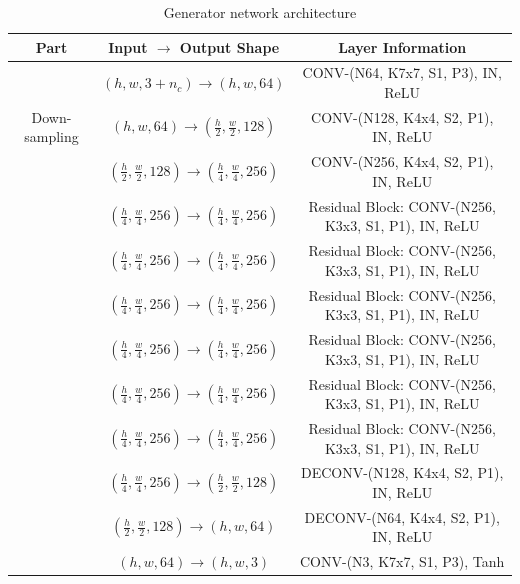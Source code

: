 \documentclass[10pt,twocolumn,letterpaper]{article}
\begin{document}
\medskip



\begin{table}[h]
\setlength{\tabcolsep}{13pt}
\renewcommand{\arraystretch}{1.7}
\begin{center}
\begin{tabular}{c  c  c}
Part & Input $\rightarrow$ Output Shape & Layer Information \\
\hline \hline
\multirow{3}{*}{Down-sampling} & $(h, w, 3+{n}_{c}) \rightarrow (h, w, 64)$ & CONV-(N64, K7x7, S1, P3), IN, ReLU \\
& $(h, w, 64) \rightarrow (\frac{h}{2}, \frac{w}{2}, 128)$ & CONV-(N128, K4x4, S2, P1), IN, ReLU \\
& $(\frac{h}{2}, \frac{w}{2}, 128) \rightarrow (\frac{h}{4}, \frac{w}{4},256)$ & CONV-(N256, K4x4, S2, P1), IN, ReLU \\
\Xhline{1.0pt}
\multirow{6}{*}{Bottleneck} & $(\frac{h}{4}, \frac{w}{4}, 256) \rightarrow (\frac{h}{4}, \frac{w}{4}, 256)$ & Residual Block: CONV-(N256, K3x3, S1, P1), IN, ReLU\\
 & $(\frac{h}{4}, \frac{w}{4}, 256) \rightarrow (\frac{h}{4}, \frac{w}{4}, 256)$ &  Residual Block: CONV-(N256, K3x3, S1, P1), IN, ReLU \\
 & $(\frac{h}{4}, \frac{w}{4}, 256) \rightarrow (\frac{h}{4}, \frac{w}{4}, 256)$ &   Residual Block: CONV-(N256, K3x3, S1, P1), IN, ReLU  \\
 & $(\frac{h}{4}, \frac{w}{4}, 256) \rightarrow (\frac{h}{4}, \frac{w}{4}, 256)$ &   Residual Block: CONV-(N256, K3x3, S1, P1), IN, ReLU  \\
 & $(\frac{h}{4}, \frac{w}{4}, 256) \rightarrow (\frac{h}{4}, \frac{w}{4}, 256)$ &   Residual Block: CONV-(N256, K3x3, S1, P1), IN, ReLU  \\
 & $(\frac{h}{4}, \frac{w}{4}, 256) \rightarrow (\frac{h}{4}, \frac{w}{4}, 256)$ &   Residual Block: CONV-(N256, K3x3, S1, P1), IN, ReLU  \\
\Xhline{1.0pt}
\multirow{3}{*}{Up-sampling} & $(\frac{h}{4}, \frac{w}{4}, 256) \rightarrow (\frac{h}{2}, \frac{w}{2}, 128)$ & DECONV-(N128, K4x4, S2, P1), IN, ReLU \\
 & $(\frac{h}{2}, \frac{w}{2}, 128) \rightarrow (h, w, 64)$ & DECONV-(N64, K4x4, S2, P1), IN, ReLU \\
 & $(h, w, 64) \rightarrow (h, w, 3)$ & CONV-(N3, K7x7, S1, P3), Tanh \\
\hline
\hline
\end{tabular}
\end{center}
\caption{Generator network architecture}
\label{table5}
\end{table}
\end{document}
